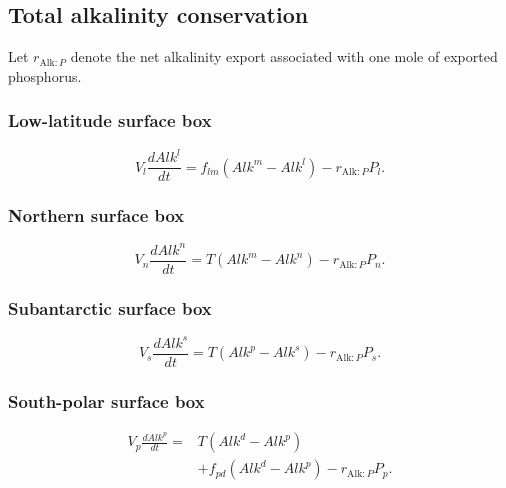 \documentclass[11pt]{article}
\begin{document}
\subsection{Total alkalinity conservation}

Let \(r_{\mathrm{Alk}:P}\) denote the net alkalinity export
associated with one mole of exported phosphorus.

\subsubsection{Low-latitude surface box}

\begin{equation}
V_l\frac{dAlk^l}{dt}
=
f_{lm}
\left(
Alk^m-Alk^l
\right)
-
r_{\mathrm{Alk}:P}P_l.
\label{eq:seven_alk_l}
\end{equation}

\subsubsection{Northern surface box}

\begin{equation}
V_n\frac{dAlk^n}{dt}
=
T
\left(
Alk^m-Alk^n
\right)
-
r_{\mathrm{Alk}:P}P_n.
\label{eq:seven_alk_n}
\end{equation}

\subsubsection{Subantarctic surface box}

\begin{equation}
V_s\frac{dAlk^s}{dt}
=
T
\left(
Alk^p-Alk^s
\right)
-
r_{\mathrm{Alk}:P}P_s.
\label{eq:seven_alk_s}
\end{equation}

\subsubsection{South-polar surface box}

\begin{equation}
\begin{split}
V_p\frac{dAlk^p}{dt}
={}&
T
\left(
Alk^d-Alk^p
\right)
\\
&+
f_{pd}
\left(
Alk^d-Alk^p
\right)
-
r_{\mathrm{Alk}:P}P_p.
\end{split}
\label{eq:seven_alk_p}
\end{equation}
\end{document}
